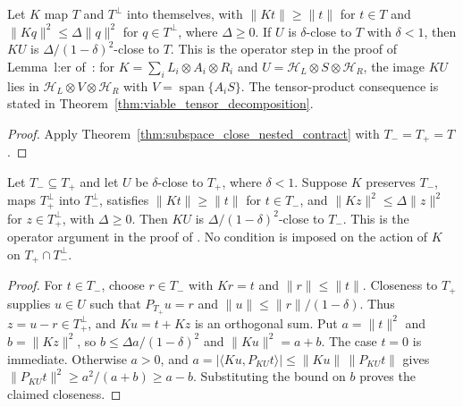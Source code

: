 \begin{theorem}
    \label{thm:subspace_close_contract}
    \leanok
    Let $K$ map $T$ and $T^\perp$ into themselves, with
    $\lVert Kt\rVert\ge\lVert t\rVert$ for $t\in T$ and
    $\lVert Kq\rVert^2\le\Delta\lVert q\rVert^2$ for $q\in T^\perp$, where
    $\Delta\ge0$. If $U$ is $\delta$-close to $T$ with $\delta<1$, then $KU$
    is $\Delta/(1-\delta)^2$-close to $T$. This is the operator step in the
    proof of Lemma~l:er of~\cite[lines 606--622]{Arad2016RigorousRG}: for
    $K=\sum_iL_i\otimes A_i\otimes R_i$ and
    $U=\mathcal H_L\otimes S\otimes\mathcal H_R$, the image $KU$ lies in
    $\mathcal H_L\otimes V\otimes\mathcal H_R$ with
    $V=\operatorname{span}\{A_iS\}$. The tensor-product consequence is stated in
    Theorem~\ref{thm:viable_tensor_decomposition}.
\end{theorem}

\begin{proof}
    \leanok
    Apply Theorem~\ref{thm:subspace_close_nested_contract} with
    $T_-=T_+=T$.
\end{proof}

\begin{theorem}
    \label{thm:subspace_close_nested_contract}
    \leanok
    Let $T_-\subseteq T_+$ and let $U$ be $\delta$-close to $T_+$,
    where $\delta<1$. Suppose $K$ preserves $T_-$, maps $T_+^\perp$ into
    $T_-^\perp$, satisfies $\|Kt\|\ge\|t\|$ for $t\in T_-$, and
    $\|Kz\|^2\le\Delta\|z\|^2$ for $z\in T_+^\perp$, with
    $\Delta\ge0$. Then $KU$ is $\Delta/(1-\delta)^2$-close to $T_-$.
    This is the operator argument in the proof of
    \cite[Theorem~4.8, lines 1037--1041]{Arad2016RigorousRG}.
    No condition is imposed on the action of $K$ on
    $T_+\cap T_-^\perp$.
\end{theorem}

\begin{proof}
    \leanok
    For $t\in T_-$, choose $r\in T_-$ with $Kr=t$ and
    $\|r\|\le\|t\|$. Closeness to $T_+$ supplies $u\in U$ such that
    $P_{T_+}u=r$ and $\|u\|\le\|r\|/(1-\delta)$.
    Thus $z=u-r\in T_+^\perp$, and $Ku=t+Kz$ is an orthogonal sum.
    Put $a=\|t\|^2$ and $b=\|Kz\|^2$, so
    $b\le\Delta a/(1-\delta)^2$ and $\|Ku\|^2=a+b$.
    The case $t=0$ is immediate. Otherwise $a>0$, and
    $a=|\langle Ku,P_{KU}t\rangle|\le\|Ku\|\,\|P_{KU}t\|$ gives
    $\|P_{KU}t\|^2\ge a^2/(a+b)\ge a-b$.
    Substituting the bound on $b$ proves the claimed closeness.
\end{proof}

